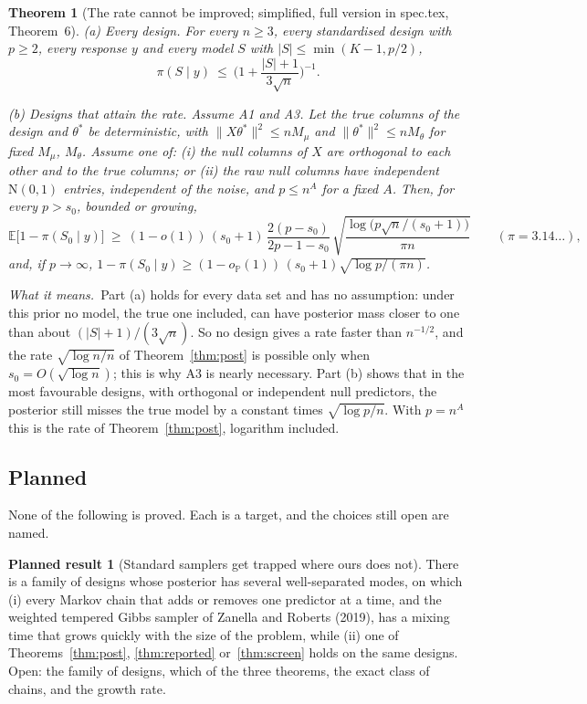 \documentclass[11pt]{article}
\renewcommand{\P}{\mathbb{P}}
\newcommand{\E}{\mathbb{E}}
\newcommand{\N}{\mathrm{N}}
\newcommand{\abs}[1]{\lvert #1\rvert}
\newcommand{\norm}[1]{\lVert #1\rVert}
\newcommand{\tstar}{\theta^*}
\newcommand{\Sz}{S_0}
\newcommand{\sz}{s_0}
\newcommand{\pis}[1]{\pi(#1\mid y)}
\newcommand{\rn}{\sqrt{\log n/n}}
\newcommand{\oP}{o_{\P}}
\theoremstyle{plain}
\newtheorem{thm}{Theorem}
\theoremstyle{definition}
\newtheorem{planned}{Planned result}
\newcommand{\means}{\par\smallskip\noindent\textit{What it means.}\ }
\begin{document}
\begin{thm}[The rate cannot be improved; simplified, full version in spec.tex, Theorem~6]\label{thm:sharp}
\textup{(a)} \emph{Every design.} For every $n\ge3$, every standardised design with $p\ge2$, every response $y$ and
every model $S$ with $\abs{S}\le\min(K-1,p/2)$,
\[
  \pis{S}\ \le\ \Big(1+\frac{\abs{S}+1}{3\sqrt n}\Big)^{-1}.
\]

\textup{(b)} \emph{Designs that attain the rate.} Assume A1 and A3. Let the true columns of the design and $\tstar$ be
deterministic, with $\norm{X\tstar}^2\le nM_\mu$ and $\norm{\tstar}^2\le nM_\theta$ for fixed $M_\mu$, $M_\theta$.
Assume one of: \textup{(i)} the null columns of $X$ are orthogonal to each other and to the true columns; or
\textup{(ii)} the raw null columns have independent $\N(0,1)$ entries, independent of the noise, and $p\le n^A$ for a
fixed $A$. Then, for every $p>\sz$, bounded or growing,
\[
  \E\big[1-\pis{\Sz}\big]\ \ge\ (1-o(1))\,(\sz+1)\,\frac{2(p-\sz)}{2p-1-\sz}\,
  \sqrt{\frac{\log\!\big(p\sqrt n/(\sz+1)\big)}{\pi n}}\qquad(\pi=3.14\ldots),
\]
and, if $p\to\infty$, $1-\pis{\Sz}\ge(1-\oP(1))\,(\sz+1)\sqrt{\log p/(\pi n)}$.
\end{thm}
\means Part (a) holds for every data set and has no assumption: under this prior no model, the true one included, can
have posterior mass closer to one than about $(\abs{S}+1)/(3\sqrt n)$. So no design gives a rate faster than
$n^{-1/2}$, and the rate $\rn$ of Theorem~\ref{thm:post} is possible only when $\sz=O(\sqrt{\log n})$; this is why A3
is nearly necessary. Part (b) shows that in the most favourable designs, with orthogonal or independent null
predictors, the posterior still misses the true model by a constant times $\sqrt{\log p/n}$. With $p=n^A$ this is the
rate of Theorem~\ref{thm:post}, logarithm included.

\subsection{Planned}

None of the following is proved. Each is a target, and the choices still open are named.

\begin{planned}[Standard samplers get trapped where ours does not]
There is a family of designs whose posterior has several well-separated modes, on which (i) every Markov chain that
adds or removes one predictor at a time, and the weighted tempered Gibbs sampler of Zanella and Roberts (2019), has a
mixing time that grows quickly with the size of the problem, while (ii) one of Theorems~\ref{thm:post},
\ref{thm:reported} or~\ref{thm:screen} holds on the same designs. Open: the family of designs, which of the three
theorems, the exact class of chains, and the growth rate.
\end{planned}
\end{document}
